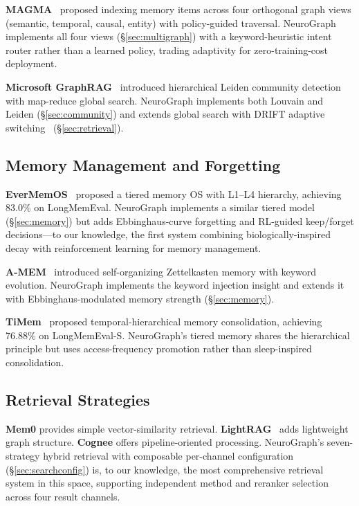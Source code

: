 \documentclass[11pt,a4paper,twocolumn]{article}
\begin{document}
\textbf{MAGMA}~\cite{magma2026} proposed indexing memory items
across four orthogonal graph views (semantic, temporal, causal,
entity) with policy-guided traversal. NeuroGraph implements all
four views (\S\ref{sec:multigraph}) with a keyword-heuristic
intent router rather than a learned policy, trading adaptivity
for zero-training-cost deployment.

\textbf{Microsoft GraphRAG}~\cite{graphrag2024} introduced
hierarchical Leiden community detection with map-reduce global
search. NeuroGraph implements both Louvain and Leiden
(\S\ref{sec:community}) and extends global search with DRIFT
adaptive switching~\cite{drift2026} (\S\ref{sec:retrieval}).

\subsection{Memory Management and Forgetting}

\textbf{EverMemOS}~\cite{evermemos2026,evermemos2026b} proposed
a tiered memory OS with L1--L4 hierarchy, achieving 83.0\% on
LongMemEval. NeuroGraph implements a similar tiered model
(\S\ref{sec:memory}) but adds Ebbinghaus-curve forgetting and
RL-guided keep/forget decisions---to our knowledge, the first
system combining biologically-inspired decay with reinforcement
learning for memory management.

\textbf{A-MEM}~\cite{amem2025} introduced self-organizing
Zettelkasten memory with keyword evolution. NeuroGraph implements
the keyword injection insight and extends it with
Ebbinghaus-modulated memory strength (\S\ref{sec:memory}).

\textbf{TiMem}~\cite{timem2026} proposed temporal-hierarchical
memory consolidation, achieving 76.88\% on LongMemEval-S.
NeuroGraph's tiered memory shares the hierarchical principle
but uses access-frequency promotion rather than sleep-inspired
consolidation.

\subsection{Retrieval Strategies}

\textbf{Mem0} provides simple vector-similarity retrieval.
\textbf{LightRAG}~\cite{lightrag2024} adds lightweight graph
structure. \textbf{Cognee} offers pipeline-oriented processing.
NeuroGraph's seven-strategy hybrid retrieval with composable
per-channel configuration (\S\ref{sec:searchconfig}) is, to our
knowledge, the most comprehensive retrieval system in this space,
supporting independent method and reranker selection across four
result channels.
\end{document}
